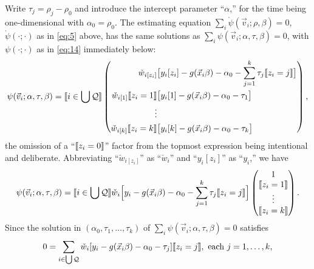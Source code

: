 \documentclass{article}
\DeclarePairedDelimiter{\indicator}{\llbracket}{\rrbracket}
\newcommand{\owt}[1][{[z_{i}]}]{\ensuremath{\check{w}_{i#1}}}
\begin{document}
Write $\tau_{j}=\rho_{j}-\rho_{0}$ and introduce the intercept parameter ``$\alpha$,''  for the time being one-dimensional with $\alpha_{0}=\rho_{0}$.   The estimating equation $\sum_{i}\grave{\psi}(\vec{v}_{i}; \rho, \beta)=0$,
$\grave{\psi}(\cdot; \cdot)$ as in \eqref{eq:5} above, has the same solutions as $\sum_{i}\psi(\vec{v}_{i};
  \alpha, \tau, \beta)=0$, with $\psi(\cdot; \cdot)$ as in \eqref{eq:14} immediately below:
\begin{equation} \label{eq:14}
         \psi(\vec{v}_{i};
         \alpha, \tau, \beta) =
         \indicator{i \in \bigcup \mathcal{Q}}
         \left( \begin{aligned}
           \owt[{[z_{i}]}] &\big[y_{i}[z_{i}] - g(\vec{x}_{i}\beta)-
                  \alpha_{0} - \sum_{j=1}^{k}\tau_{j}\indicator{z_{i}=j}\big]\\
           \owt[{[1]}]\indicator{z_{i}=1} & \big[y_{i}[1] - g(\vec{x}_{i}\beta)-
                  \alpha_{0}-\tau_{1}\big]\\
                  \vdots \\
           \owt[{[k]}]\indicator{z_{i}=k} & \big[y_{i}[k] - g(\vec{x}_{i}\beta)-
                 \alpha_{0} - \tau_{k}\big]\\
                \end{aligned}\right), 
\end{equation}
the omission of a ``$\indicator{z_{i}=0}$'' factor from the topmost
expression being intentional and deliberate.
Abbreviating ``$\owt{}$'' as ``$\owt[]$'' and ``$y_{i}[z_{i}]$'' as
``$y_{i}$,'' we have
\begin{equation}\label{eq:27}
         \psi(\vec{v}_{i};
         \alpha, \tau, \beta) =
         \indicator{i \in \bigcup \mathcal{Q}}
  \owt[] \Big[y_{i} - g(\vec{x}_{i}\beta)-
                  \alpha_{0} -
                  \sum_{j=1}^{k}\tau_{j}\indicator{z_{i}=j}\Big]
                  \begin{pmatrix} 1 \\ \indicator{z_{i}=1}\\ \vdots
                    \\ \indicator{z_{i}=k}\end{pmatrix} .
\end{equation}
Since the solution in 
$(\alpha_{0}, \tau_{1}, \ldots, \tau_{k})$ of
$\sum_{i}\psi(\vec{v}_{i}; \alpha, \tau, \beta) =0$ satisfies
\begin{equation} \label{eq:16}
       0 = \sum_{i \in \bigcup \mathcal{Q}}\owt[][y_{i} - g(\vec{x}_{i}\beta)-
                  \alpha_{0}-\tau_{j}]\indicator{z_{i}=j}, \text{ each } j=1, \ldots, k,
\end{equation}
\end{document}
